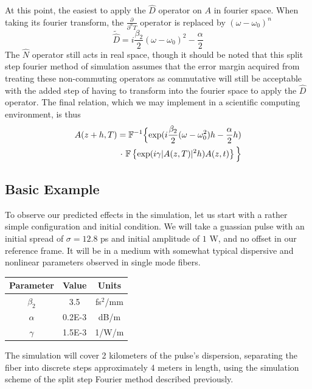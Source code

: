 \documentclass[10pt, a4paper, twocolumn]{article} %
\begin{document}
At this point, the easiest to apply the $\hat{D}$ operator on $A$ in fourier space. When taking its fourier transform, the $\frac{\partial}{\partial^n T}$ operator is replaced by $(\omega - \omega_0)^n$ \cite{AgrawalChap2}
$$\tilde{\hat{D}} = i \frac{\beta_2}{2} (\omega - \omega_0)^2 - \frac{\alpha}{2}$$
The $\hat{N}$ operator still acts in real space, though it should be noted that this split step fourier method of simulation assumes that the error margin acquired from treating these non-commuting operators as commutative will still be acceptable with the added step of having to transform into the fourier space to apply the $\hat{D}$ operator. The final relation, which we may implement in a scientific computing environment, is thus \cite{Munaweera}
\begin{align*}
    A(z + h, T) = \mathbb{F}^{-1} \Bigl\{ \mathrm{exp}(i \frac{\beta_2}{2} (\omega - \omega_0^2)h - \frac{\alpha}{2}h) \\ \cdot \ \mathbb{F} \left\{ \mathrm{exp}(i\gamma |A(z, T)|^2 h) A(z, t) \right\} \Bigl\}
\end{align*}

\subsection{Basic Example}
To observe our predicted effects in the simulation, let us start with a rather simple configuration and initial condition. We will take a guassian pulse with an initial spread of $\sigma = 12.8$ ps and initial amplitude of $1$ W, and no offset in our reference frame. It will be in a medium with somewhat typical dispersive and nonlinear parameters observed in single mode fibers\cite{Yamamoto}.
\begin{center}
\begin{tabular}{|c | c c|}
    \hline Parameter & Value & Units\\
    \hline
    $\beta_2$ & 3.5 & fs$^2$/mm\\
    $\alpha$ & 0.2E-3 & dB/m\\
    $\gamma$ & 1.5E-3 & 1/W/m\\
    \hline
\end{tabular}
\end{center}
The simulation will cover 2 kilometers of the pulse's dispersion, separating the fiber into discrete steps approximately 4 meters in length, using the simulation scheme of the split step Fourier method described previously.
\end{document}

